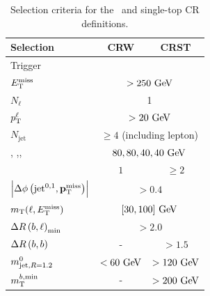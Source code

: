 		\begin{table}[htpb]
		  \caption{Selection criteria for the \Wjets\ and single-top \ac{CR} definitions.} 
		  \begin{center}
		    \def\arraystretch{1.4}
		    \begin{tabular}{lcc}
		  	  \toprule
		     \textbf{Selection}                       &\textbf{CRW}                                             & \textbf{CRST}  \\ \toprule
		      Trigger                         & \multicolumn{2}{c}{\met}             \\ 
				$E_{\mathrm{T}}^{\mathrm{miss}}$                         & \multicolumn{2}{c}{$>250 \gev$}													\\ \midrule
		      $N_{\ell}$                      & \multicolumn{2}{c}{1}                                                           \\ 
		     	$p_{\mathrm{T}}^{\ell}$                     & \multicolumn{2}{c}{$>20 \gev$}      \\ \midrule
		     	$N_{\mathrm{jet}}$               & \multicolumn{2}{c}{$\ge 4$ (including lepton)}            \\
		      \ptzero, \ptone,\pttwo,\ptthree & \multicolumn{2}{c}{$80,80,40,40\gev$}                                          \\
		      \nBJet                          & $1$                                            & $ \ge 2 $ 							\\ \midrule
		      $\left|\Delta\phi\left(\mathrm{jet}^{0,1},\mathbf{p}_\mathrm{T}^\mathrm{miss}\right)\right|$                & \multicolumn{2}{c}{$>0.4$}                                                  \\ 
		      $m_{\mathrm{T}}(\ell,E_{\mathrm{T}}^{\mathrm{miss}})$                & \multicolumn{2}{c}{$[30,100]\gev$}                                          \\ 
		      $\Delta R\left(b,\ell\right)_{\mathrm{min}}$                     & \multicolumn{2}{c}{$>2.0$}                                                  \\ 
				$\Delta R\left(b,b\right)$                  & -                                               & $>1.5$                     \\ 
				$m^{0}_{\mathrm{jet,}R=1.2}$           & $<60\gev$                             & $>120\gev$                     \\ 
				$m_{\mathrm{T}}^{b,\mathrm{min}}$                      & -                          & $>200\gev$                     \\ 
		      \bottomrule
		    \end{tabular}
		  \end{center}
		  \label{tab:selectionCRWST}
		\end{table}

